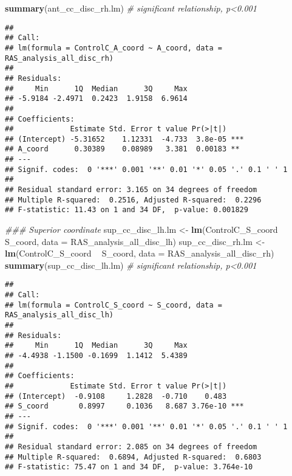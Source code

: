 \documentclass[
]{article}
\newenvironment{Shaded}{\begin{snugshade}}{\end{snugshade}}
\newcommand{\CommentTok}[1]{\textcolor[rgb]{0.56,0.35,0.01}{\textit{#1}}}
\newcommand{\DataTypeTok}[1]{\textcolor[rgb]{0.13,0.29,0.53}{#1}}
\newcommand{\KeywordTok}[1]{\textcolor[rgb]{0.13,0.29,0.53}{\textbf{#1}}}
\newcommand{\NormalTok}[1]{#1}
\newcommand{\OperatorTok}[1]{\textcolor[rgb]{0.81,0.36,0.00}{\textbf{#1}}}
\newcommand{\StringTok}[1]{\textcolor[rgb]{0.31,0.60,0.02}{#1}}
\begin{document}
\begin{Shaded}
\begin{Highlighting}[]
\KeywordTok{summary}\NormalTok{(ant_cc_disc_rh.lm) }\CommentTok{# significant relationship, p<0.001}
\end{Highlighting}
\end{Shaded}

\begin{verbatim}
## 
## Call:
## lm(formula = ControlC_A_coord ~ A_coord, data = RAS_analysis_all_disc_rh)
## 
## Residuals:
##     Min      1Q  Median      3Q     Max 
## -5.9184 -2.4971  0.2423  1.9158  6.9614 
## 
## Coefficients:
##             Estimate Std. Error t value Pr(>|t|)    
## (Intercept) -5.31652    1.12331  -4.733  3.8e-05 ***
## A_coord      0.30389    0.08989   3.381  0.00183 ** 
## ---
## Signif. codes:  0 '***' 0.001 '**' 0.01 '*' 0.05 '.' 0.1 ' ' 1
## 
## Residual standard error: 3.165 on 34 degrees of freedom
## Multiple R-squared:  0.2516, Adjusted R-squared:  0.2296 
## F-statistic: 11.43 on 1 and 34 DF,  p-value: 0.001829
\end{verbatim}

\begin{Shaded}
\begin{Highlighting}[]
\CommentTok{### Superior coordinate}
\NormalTok{sup_cc_disc_lh.lm <-}\StringTok{ }\KeywordTok{lm}\NormalTok{(ControlC_S_coord }\OperatorTok{~}\StringTok{ }\NormalTok{S_coord, }\DataTypeTok{data =}\NormalTok{ RAS_analysis_all_disc_lh)}
\NormalTok{sup_cc_disc_rh.lm <-}\StringTok{ }\KeywordTok{lm}\NormalTok{(ControlC_S_coord }\OperatorTok{~}\StringTok{ }\NormalTok{S_coord, }\DataTypeTok{data =}\NormalTok{ RAS_analysis_all_disc_rh)}
\KeywordTok{summary}\NormalTok{(sup_cc_disc_lh.lm) }\CommentTok{# significant relationship, p<0.001}
\end{Highlighting}
\end{Shaded}

\begin{verbatim}
## 
## Call:
## lm(formula = ControlC_S_coord ~ S_coord, data = RAS_analysis_all_disc_lh)
## 
## Residuals:
##     Min      1Q  Median      3Q     Max 
## -4.4938 -1.1500 -0.1699  1.1412  5.4389 
## 
## Coefficients:
##             Estimate Std. Error t value Pr(>|t|)    
## (Intercept)  -0.9108     1.2828  -0.710    0.483    
## S_coord       0.8997     0.1036   8.687 3.76e-10 ***
## ---
## Signif. codes:  0 '***' 0.001 '**' 0.01 '*' 0.05 '.' 0.1 ' ' 1
## 
## Residual standard error: 2.085 on 34 degrees of freedom
## Multiple R-squared:  0.6894, Adjusted R-squared:  0.6803 
## F-statistic: 75.47 on 1 and 34 DF,  p-value: 3.764e-10
\end{verbatim}
\end{document}
